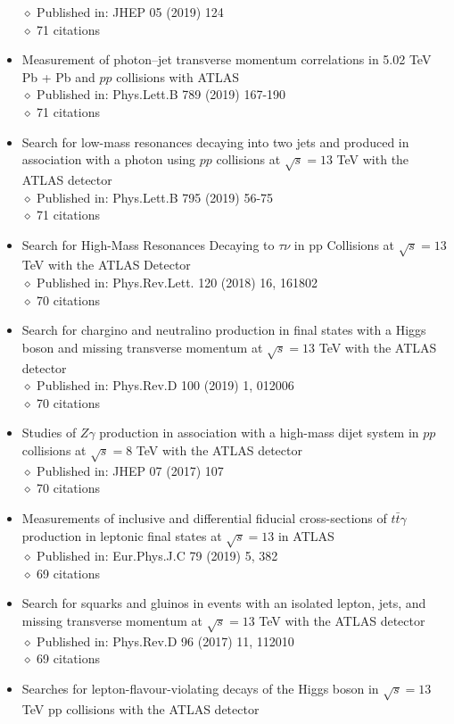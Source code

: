 \documentclass[margin, 10pt]{res} %
\begin{document}
\begin{resume}
\begin{itemize}
$\diamond$ Published in: JHEP 05 (2019) 124\\
$\diamond$ 71 citations
\item Measurement of photon–jet transverse momentum correlations in 5.02 TeV Pb + Pb and $pp$ collisions with ATLAS\\
$\diamond$ Published in: Phys.Lett.B 789 (2019) 167-190\\
$\diamond$ 71 citations
\item Search for low-mass resonances decaying into two jets and produced in association with a photon using $pp$ collisions at $\sqrt{s} = 13$ TeV with the ATLAS detector\\
$\diamond$ Published in: Phys.Lett.B 795 (2019) 56-75\\
$\diamond$ 71 citations
\item Search for High-Mass Resonances Decaying to $\tau\nu$ in pp Collisions at $\sqrt{s} = 13$ TeV with the ATLAS Detector\\
$\diamond$ Published in: Phys.Rev.Lett. 120 (2018) 16, 161802\\
$\diamond$ 70 citations
\item Search for chargino and neutralino production in final states with a Higgs boson and missing transverse momentum at $\sqrt{s} = 13$ TeV with the ATLAS detector\\
$\diamond$ Published in: Phys.Rev.D 100 (2019) 1, 012006\\
$\diamond$ 70 citations
\item Studies of $Z\gamma$ production in association with a high-mass dijet system in $pp$ collisions at $\sqrt{s} = 8$ TeV with the ATLAS detector\\
$\diamond$ Published in: JHEP 07 (2017) 107\\
$\diamond$ 70 citations
\item Measurements of inclusive and differential fiducial cross-sections of $t\bar{t}\gamma$ production in leptonic final states at $\sqrt{s} = 13$ in ATLAS\\
$\diamond$ Published in: Eur.Phys.J.C 79 (2019) 5, 382\\
$\diamond$ 69 citations
\item Search for squarks and gluinos in events with an isolated lepton, jets, and missing transverse momentum at $\sqrt{s} = 13$ TeV with the ATLAS detector\\
$\diamond$ Published in: Phys.Rev.D 96 (2017) 11, 112010\\
$\diamond$ 69 citations
\item Searches for lepton-flavour-violating decays of the Higgs boson in $\sqrt{s} = 13$ TeV pp collisions with the ATLAS detector\\

\end{itemize}
\end{resume}
\end{document}
